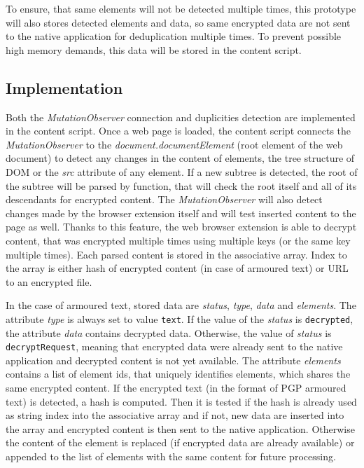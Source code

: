 To ensure, that same elements will not be detected multiple times, this prototype will also stores detected elements and data, so same encrypted data are not sent to the native application for deduplication multiple times. To prevent possible high memory demands, this data will be stored in the content script.

\subsection{Implementation}
Both the \textit{MutationObserver} connection and duplicities detection are implemented in the content script. Once a web page is loaded, the content script connects the \textit{MutationObserver} to the \textit{document.documentElement} (root element of the web document) to detect any changes in the content of elements, the tree structure of DOM or the \textit{src} attribute of any element. If a new subtree is detected, the root of the subtree will be parsed by function, that will check the root itself and all of its descendants for encrypted content. The \textit{MutationObserver} will also detect changes made by the browser extension itself and will test inserted content to the page as well. Thanks to this feature, the web browser extension is able to decrypt content, that was encrypted multiple times using multiple keys (or the same key multiple times). Each parsed content is stored in the associative array. Index to the array is either hash of encrypted content (in case of armoured text) or URL to an encrypted file.

In the case of armoured text, stored data are \textit{status}, \textit{type}, \textit{data} and \textit{elements}. The attribute \textit{type} is always set to value \texttt{text}. If the value of the \textit{status} is \texttt{decrypted}, the attribute \textit{data} contains decrypted data. Otherwise, the value of \textit{status} is \texttt{decryptRequest}, meaning that encrypted data were already sent to the native application and decrypted content is not yet available. The attribute \textit{elements} contains a list of element ids, that uniquely identifies elements, which shares the same encrypted content. If the encrypted text (in the format of PGP armoured text) is detected, a hash is computed. Then it is tested if the hash is already used as string index into the associative array and if not, new data are inserted into the array and encrypted content is then sent to the native application. Otherwise the content of the element is replaced (if encrypted data are already available) or appended to the list of elements with the same content for future processing.

